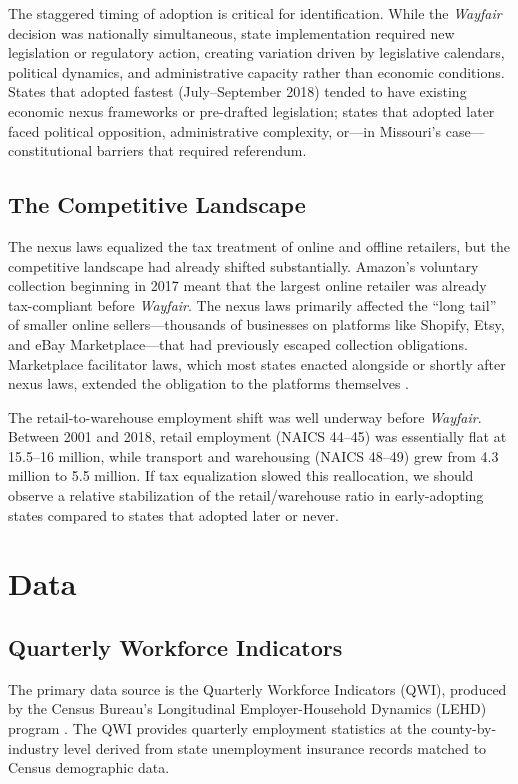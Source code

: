 \documentclass[12pt]{article}
\begin{document}
The staggered timing of adoption is critical for identification. While the \textit{Wayfair} decision was nationally simultaneous, state implementation required new legislation or regulatory action, creating variation driven by legislative calendars, political dynamics, and administrative capacity rather than economic conditions. States that adopted fastest (July--September 2018) tended to have existing economic nexus frameworks or pre-drafted legislation; states that adopted later faced political opposition, administrative complexity, or---in Missouri's case---constitutional barriers that required referendum.

\subsection{The Competitive Landscape}

The nexus laws equalized the tax treatment of online and offline retailers, but the competitive landscape had already shifted substantially. Amazon's voluntary collection beginning in 2017 meant that the largest online retailer was already tax-compliant before \textit{Wayfair}. The nexus laws primarily affected the ``long tail'' of smaller online sellers---thousands of businesses on platforms like Shopify, Etsy, and eBay Marketplace---that had previously escaped collection obligations. Marketplace facilitator laws, which most states enacted alongside or shortly after nexus laws, extended the obligation to the platforms themselves \citep{agrawal2023}.

The retail-to-warehouse employment shift was well underway before \textit{Wayfair}. Between 2001 and 2018, retail employment (NAICS 44--45) was essentially flat at 15.5--16 million, while transport and warehousing (NAICS 48--49) grew from 4.3 million to 5.5 million. If tax equalization slowed this reallocation, we should observe a relative stabilization of the retail/warehouse ratio in early-adopting states compared to states that adopted later or never.


\section{Data}
\label{sec:data}

\subsection{Quarterly Workforce Indicators}

The primary data source is the Quarterly Workforce Indicators (QWI), produced by the Census Bureau's Longitudinal Employer-Household Dynamics (LEHD) program \citep{abowd2009}. The QWI provides quarterly employment statistics at the county-by-industry level derived from state unemployment insurance records matched to Census demographic data.
\end{document}
